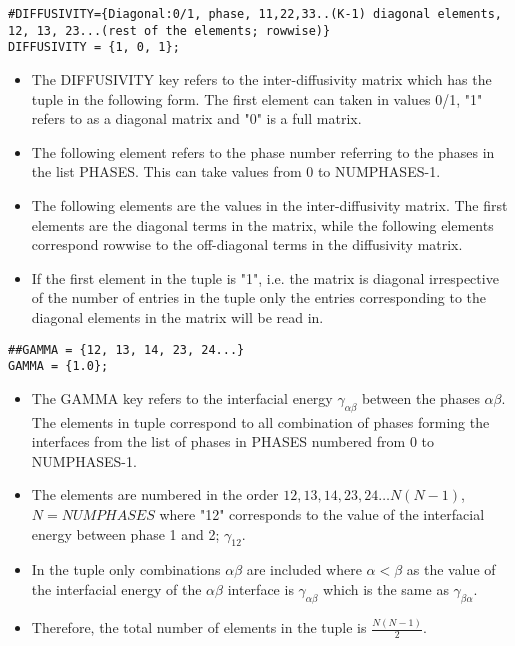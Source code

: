 \documentclass[a4paper,10pt]{article}
\begin{document}
\begin{lstlisting}
#DIFFUSIVITY={Diagonal:0/1, phase, 11,22,33..(K-1) diagonal elements, 12, 13, 23...(rest of the elements; rowwise)}
DIFFUSIVITY = {1, 0, 1};
\end{lstlisting}

\begin{itemize}
 \item The DIFFUSIVITY key refers to the inter-diffusivity matrix which has the tuple in the following form. The first element can taken in values 0/1, "1" refers to as a diagonal matrix and "0" is a full matrix.
 \item The following element refers to the phase number referring to the phases in the list PHASES. This can take values from 0 to NUMPHASES-1.
 \item The following elements are the values in the inter-diffusivity matrix. The first elements are the diagonal terms in the matrix, while the following 
 elements correspond rowwise to the off-diagonal terms in the diffusivity matrix.
 \item If the first element in the tuple is "1", i.e. the matrix is diagonal irrespective of the number of entries in the tuple only the entries 
 corresponding to the diagonal elements in the matrix will be read in.
\end{itemize}

\begin{lstlisting}
##GAMMA = {12, 13, 14, 23, 24...}
GAMMA = {1.0};
\end{lstlisting}

\begin{itemize}
 \item The GAMMA key refers to the interfacial energy $\gamma_{\alpha\beta}$ between the phases $\alpha\beta$. 
 The elements in tuple correspond to all combination of phases forming the interfaces from the list of phases in PHASES numbered from 0 to NUMPHASES-1.
 \item The elements are numbered in the order ${12,13,14,23,24 \ldots N(N-1)}$, $N=NUMPHASES$ where "12" corresponds to the value of the interfacial energy between phase 1 and 2; $\gamma_{12}$.
 \item In the tuple only combinations $\alpha\beta$ are included where $\alpha<\beta$ as the value of the interfacial energy of the $\alpha\beta$ interface is $\gamma_{\alpha\beta}$ which is the same as 
 $\gamma_{\beta\alpha}$.
 \item Therefore, the total number of elements in the tuple is $\frac{N(N-1)}{2}$.
\end{itemize}
\end{document}
